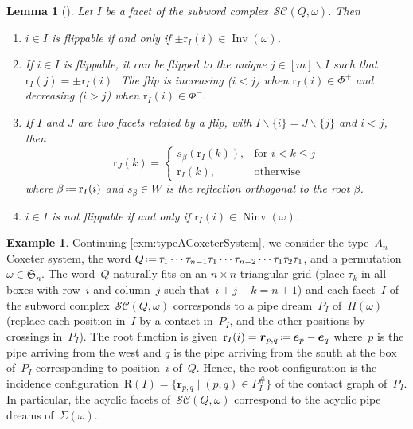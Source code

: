 \documentclass[reqno]{amsart}
\newtheorem{lemma}[theorem]{Lemma}
\theoremstyle{definition}
\newtheorem{example}[theorem]{Example}
\renewcommand{\b}[1]{\boldsymbol{#1}} %
\newcommand{\bigset}[2]{\big\{ #1 \;|\; #2 \big\}} %
\newcommand{\ssm}{\smallsetminus} %
\newcommand{\eqdef}{\mbox{\,\raisebox{0.2ex}{\scriptsize\ensuremath{\mathrm:}}\ensuremath{=}\,}} %
\DeclareMathOperator{\Inv}{Inv} %
\DeclareMathOperator{\Ninv}{Ninv} %
\newcommand{\fS}{\mathfrak{S}} %
\newcommand{\pipeDreams}{\Pi} %
\newcommand{\contact}{^\#} %
\newcommand{\acyclicPipeDreams}{\Sigma} %
\newcommand{\subwordComplex}{\mathcal{SC}} %
\newcommand{\Roots}{\mathrm{R}} %
\newcommand{\rootFunction}[2]{\mathrm{r}_{#1}(#2)} %
\begin{document}
\begin{lemma}[{\cite{CeballosLabbeStump, KnutsonMiller-subwordComplex}}]
\label{lem:rootFunctionFlips}
Let $I$ be a facet of the subword complex~$\subwordComplex(Q,\omega)$.
Then
\begin{enumerate}
\item $i \in I$ is flippable if and only if $\pm \rootFunction{I}{i} \in \Inv(\omega)$.
\item If $i \in I$ is flippable, it can be flipped to the unique $j\in [m]\ssm I$ such that $\rootFunction{I}{j} = \pm\rootFunction{I}{i}$.
The flip is increasing ($i<j$) when $\rootFunction{I}{i}\in \Phi^+$ and decreasing ($i>j$) when $\rootFunction{I}{i}\in \Phi^-$.
\label{lem:rootFunctionFlips2}
\item If $I$ and $J$ are two facets related by a flip, with $I \ssm \{i\} = J \ssm  \{j\}$ and $i < j$, then
\[
\rootFunction{J}{k} = 
\begin{cases}
s_\beta(\rootFunction{I}{k}), & \text{for } i < k \leq j \\
\rootFunction{I}{k}, & \text{otherwise}
\end{cases}
\]
where $\beta \eqdef \rootFunction{I}{i}$ and $s_\beta\in W$ is the reflection orthogonal to the root $\beta$.
\label{lem:rootFunctionFlips3}
\item $i \in I$ is not flippable if and only if $\rootFunction{I}{i}\in \Ninv(\omega)$.
\end{enumerate}
\end{lemma}

\begin{example}
\label{exm:typeARootConfiguration}
Continuing \cref{exm:typeACoxeterSystem}, we consider the type~$A_n$ Coxeter system, the word $Q \eqdef \tau_1 \cdots \tau_{n-1} \tau_1 \cdots \tau_{n-2} \cdots \tau_1 \tau_2 \tau_1$, and a permutation~$\omega \in \fS_n$.
The word~$Q$ naturally fits on an $n \times n$ triangular grid (place $\tau_k$ in all boxes with row~$i$ and column~$j$ such that~$i+j+k = n+1$) and each facet~$I$ of the subword complex~$\subwordComplex(Q, \omega)$ corresponds to a pipe dream~$P_I$ of~$\pipeDreams(\omega)$ (replace each position in~$I$ by a contact in~$P_I$, and the other positions by crossings in~$P_I$).
The root function is given~$\rootFunction{I}{i} = \b{r}_{p,q} \eqdef \b{e}_p - \b{e}_q$ where~$p$ is the pipe arriving from the west and $q$ is the pipe arriving from the south at the box of~$P_I$ corresponding to position~$i$ of~$Q$.
Hence, the root configuration is the incidence configuration~$\Roots(I) = \bigset{\b{r}_{p,q}}{(p,q) \in P_I\contact}$ of the contact graph of~$P_I$.
In particular, the acyclic facets of~$\subwordComplex(Q, \omega)$ correspond to the acyclic pipe dreams of~$\acyclicPipeDreams(\omega)$.
\end{example}
\end{document}

